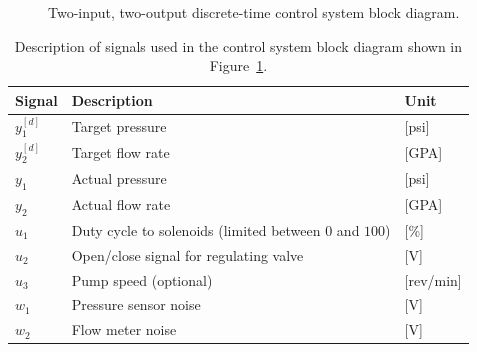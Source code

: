 \begin{figure}
  \caption[Two-input, two-output discrete-time control system block diagram.]{Two-input, two-output discrete-time control system block diagram.}
  \label{fig:twoInputTwoOutputDT-ControlSystem}
\end{figure}
%
\begin{table}
  \centering
  \caption{Description of signals used in the control system block diagram shown in Figure~\ref{fig:twoInputTwoOutputDT-ControlSystem}.}
  \label{tab:signalDescription}
  \begin{tabular}{lll}
    \toprule[1.5pt]
    Signal& Description& Unit\\
    \toprule
    $y_1^{[d]}$ & Target pressure & [psi]\\
    $y_2^{[d]}$ & Target flow rate& [GPA]\\
    $y_1$ & Actual pressure & [psi]\\
    $y_2$ & Actual flow rate& [GPA]\\
    $u_1$ & Duty cycle to solenoids (limited between $0$ and $100$)& [\%]\\
    $u_2$ & Open/close signal for regulating valve& [V]\\
    $u_3$ & Pump speed (optional)& [rev/min]\\
    $w_1$ & Pressure sensor noise& [V]\\
    $w_2$ & Flow meter noise& [V]\\
    \bottomrule[1.5pt]
  \end{tabular}
\end{table}
